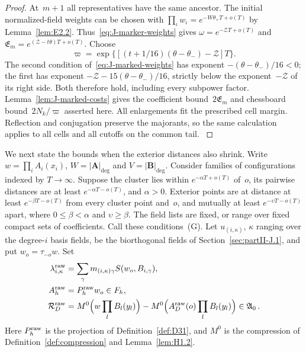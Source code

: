 \begin{proof}
At~$m+1$ all representatives have the same ancestor. The initial normalized-field weights can be chosen with $\prod_\iota w_\iota=e^{-W\theta_+T+o(T)}$ by Lemma~\ref{lem:E2.2}. Thus~\eqref{eq:J-marker-weights} gives $\omega=e^{-\mathcal ZT+o(T)}$ and $\mathfrak E_m=e^{(\mathcal Z-t\theta)T+o(T)}$. Choose
\begin{equation}\label{eq:J-terminal-weight}
\varpi=\exp\{[(t+1/16)(\theta-\theta_-)-\mathcal Z]T\}.
\end{equation}
The second condition of~\eqref{eq:J-marked-weights} has exponent $-(\theta-\theta_-)/16<0$; the first has exponent $-\mathcal Z-15(\theta-\theta_-)/16$, strictly below the exponent~$-\mathcal Z$ of its right side. Both therefore hold, including every subpower factor. Lemma~\ref{lem:J-marked-costs} gives the coefficient bound~$2\mathfrak E_m$ and chessboard bound~$2N_k/\varpi$ asserted here. All enlargements fit the prescribed cell margin. Reflection and conjugation preserve the majorants, so the same calculation applies to all cells and all cutoffs on the common tail.
\label{proof:J-lattice-end}
\end{proof}


We next state the bounds when the exterior distances also shrink. Write $w=\prod_i A_i(x_i)$, $W=|\boldsymbol A|_{\deg}$ and $V=|\boldsymbol B|_{\deg}$. Consider families of configurations indexed by $T\to\infty$. Suppose the cluster lies within $e^{-\alpha T+o(T)}$ of~$o$, its pairwise distances are at least $e^{-\alpha T-o(T)}$, and $\alpha>0$. Exterior points are at distance at least $e^{-\beta T-o(T)}$ from every cluster point and~$o$, and mutually at least $e^{-\upsilon T-o(T)}$ apart, where $0\le\beta<\alpha$ and $\upsilon\ge\beta$. The field lists are fixed, or range over fixed compact sets of coefficients. Call these conditions~(G). Let $u_{(i,\kappa)}$, $\kappa$ ranging over the degree-$i$ basis fields, be the biorthogonal fields of Section~\ref{sec:partII-J.1}, and put $w_o=\tau_{-o}w$. Set
\begin{align*}
\lambda_{i,\kappa}^{\rm raw}&=\sum_\gamma m_{(i,\kappa)\gamma}S(w_o,B_{i,\gamma}),\\
A^{\rm raw}_h&=P_h^{\rm raw}w_o\in F_h,\\
\mathcal R_D^{\rm raw}&=M^0\Bigl(w\prod_lB_l(y_l)\Bigr)
 -M^0\Bigl(A^{\rm raw}_D(o)\prod_lB_l(y_l)\Bigr)\in\mathfrak A_0\,.
\end{align*}
Here $P_h^{\rm raw}$ is the projection of Definition~\ref{def:D31}, and $M^0$ is the compression of Definition~\ref{def:compression} and Lemma~\ref{lem:H1.2}.

